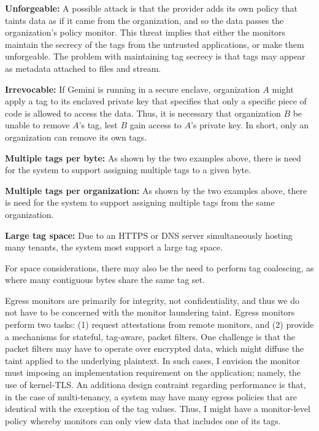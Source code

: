 \begin{widelist}
\item \textbf{Unforgeable:}
    A possible attack is that the provider adds its own policy that taints data as
    if it came from the organization, and so the data passes the organization's
    policy monitor.
    This threat implies that either the monitors maintain the secrecy of the tags
    from the untrusted applications, or make them unforgeable.
    The problem with maintaining tag secrecy is that tags may appear as metadata
    attached to files and stream.

\item \textbf{Irrevocable:}
    If Gemini is running in a secure enclave, organization $A$ might apply
    a tag to its enclaved private key that specifies that only a specific
    piece of code is allowed to access the data.
    Thus, it is necessary that organization $B$ be unable to remove $A$'s tag,
    lest $B$ gain access to $A$'s private key.
    In short, only an organization can remove its own tags.

\item \textbf{Multiple tags per byte:}
    As shown by the two examples above, there is need for the system to support
    assigning multiple tags to a given byte.

\item \textbf{Multiple tags per organization:}
    As shown by the two examples above, there is need for the system to support
    assigning multiple tags from the same organization.

\item \textbf{Large tag space:}
    Due to an HTTPS or DNS server simultaneously hosting many tenants, the
    system most support a large tag space.
\end{widelist}

For space considerations, there may also be the need to perform tag coalescing, as where
many contiguous bytes share the same tag set.


%
Egress monitors are primarily for integrity, not confidentiality, and thus
we do not have to be concerned with the monitor laundering taint.
%
Egress monitors perform two tasks: (1) request attestations from remote
monitors, and (2) provide a mechanisms for stateful, tag-aware, packet filters.
%
One challenge is that the packet filters may have to operate over encrypted
data, which might diffuse the taint applied to the underlying plaintext.
%
In such cases, I  envision the monitor must imposing
an implementation requirement on the application; namely, the use of
kernel-TLS\@.
%
An additiona design contraint regarding performance is that, in the case of
multi-tenancy, a system may have many egress policies that are identical with
the exception of the tag values.  Thus, I might have a monitor-level policy
whereby monitors can only view data that includes one of its tags.


